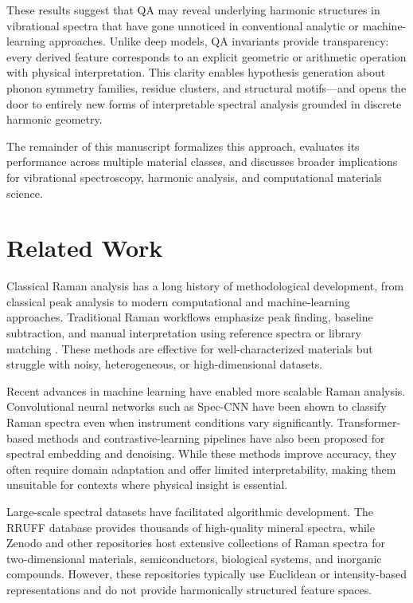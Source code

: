 \documentclass[12pt]{article}
\begin{document}
These results suggest that QA may reveal underlying harmonic structures in vibrational spectra that have
gone unnoticed in conventional analytic or machine-learning approaches. Unlike deep models, QA invariants
provide transparency: every derived feature corresponds to an explicit geometric or arithmetic operation
with physical interpretation. This clarity enables hypothesis generation about phonon symmetry families,
residue clusters, and structural motifs—and opens the door to entirely new forms of interpretable spectral
analysis grounded in discrete harmonic geometry.

The remainder of this manuscript formalizes this approach, evaluates its performance across multiple
material classes, and discusses broader implications for vibrational spectroscopy, harmonic analysis, and
computational materials science.

\section{Related Work}

Classical Raman analysis has a long history of methodological development, from classical peak analysis to
modern computational and machine-learning approaches. Traditional Raman workflows emphasize peak finding,
baseline subtraction, and manual interpretation using reference spectra or library matching
\cite{wileyRaman}. These methods are effective for well-characterized materials but struggle with noisy,
heterogeneous, or high-dimensional datasets.

Recent advances in machine learning have enabled more scalable Raman analysis. Convolutional neural
networks such as Spec-CNN \cite{speccnn} have been shown to classify Raman spectra even when instrument
conditions vary significantly. Transformer-based methods and contrastive-learning pipelines have also been
proposed for spectral embedding and denoising. While these methods improve accuracy, they often require
domain adaptation and offer limited interpretability, making them unsuitable for contexts where physical
insight is essential.

Large-scale spectral datasets have facilitated algorithmic development. The RRUFF database \cite{rruff}
provides thousands of high-quality mineral spectra, while Zenodo and other repositories host extensive
collections of Raman spectra for two-dimensional materials, semiconductors, biological systems, and
inorganic compounds. However, these repositories typically use Euclidean or intensity-based representations
and do not provide harmonically structured feature spaces.
\end{document}
